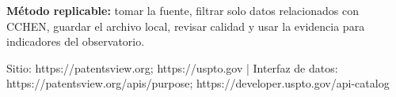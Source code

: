 \documentclass[9pt,a4paper]{extarticle}
\begin{document}
\vspace{0.06cm}
\begin{tcolorbox}[enhanced,colback=white,colframe=cchenpurple!55,boxrule=0.45pt,arc=2pt,left=6pt,right=6pt,top=5pt,bottom=5pt]
{\bfseries\color{cchenpurple}Método replicable:} tomar la fuente, filtrar solo datos relacionados con CCHEN, guardar el archivo local, revisar calidad y usar la evidencia para indicadores del observatorio.
\end{tcolorbox}

\vspace{0.02cm}
{\scriptsize\color{mutedgray}Sitio: https://patentsview.org; https://uspto.gov \quad | \quad Interfaz de datos: https://patentsview.org/apis/purpose; https://developer.uspto.gov/api-catalog}
\end{document}
